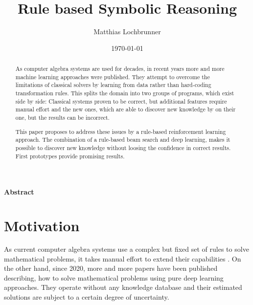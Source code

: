 \documentclass{scrartcl}
\title{Rule based Symbolic Reasoning}
\author{Matthias Lochbrunner}
\date{\today}
\theoremstyle{definition}
\begin{document}
\maketitle
\begin{center}
	\textbf{Abstract}
\end{center}
\begin{abstract}
	As computer algebra systems are used for decades, in recent years more and more machine learning approaches were published.
	They attempt to overcome the limitations of classical solvers by learning from data rather than hard-coding transformation rules.
	This splits the domain into two groups of programs, which exist side by side:
	Classical systems proven to be correct, but additional features require manual effort and the new ones,
	which are able to discover new knowledge by on their one, but the results can be incorrect.

	This paper proposes to address these issues by a rule-based reinforcement learning approach.
	The combination of a rule-based beam search and deep learning, 
	makes it possible to discover new knowledge without loosing the confidence in correct results.
	First prototypes provide promising results. 
	
\end{abstract}

\section{Motivation}

As current computer algebra systems use a complex but fixed set of rules to solve mathematical problems,
it takes manual effort to extend their capabilities \cite{wolfram}.
On the other hand, since 2020, more and more papers have been published describing, how to solve mathematical problems using pure deep learning approaches.
They operate without any knowledge database and their estimated solutions are subject to a certain degree of uncertainty.
\end{document}
